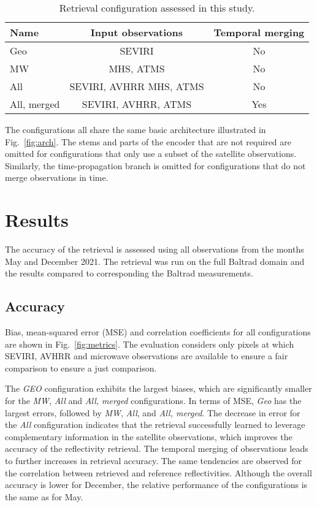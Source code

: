 \documentclass[11pt]{scrartcl}
\begin{document}
\begin{table}[hbpt]
  \begin{center}
  \begin{tabular}{l|cc}
    Name & Input observations & Temporal merging \\
    \hline
    Geo & SEVIRI & No \\
    MW & MHS, ATMS & No \\
    All & SEVIRI, AVHRR MHS, ATMS & No \\
    All, merged & SEVIRI, AVHRR, ATMS & Yes
  \end{tabular}
  \end{center}
  \caption{Retrieval configuration assessed in this study.}
  \label{tab:configurations}
  \end{table}


The configurations all share the same basic architecture illustrated in
Fig.~\ref{fig:arch}. The stems and parts of the encoder that are not required
are omitted for configurations that only use a subset of the satellite
observations. Similarly, the time-propagation branch is omitted for
configurations that do not merge observations in time.


\section{Results}
\label{sec:results}

The accuracy of the retrieval is assessed using all observations from the months
May and December 2021. The retrieval was run on the full Baltrad domain and the
results compared to corresponding the Baltrad measurements.

\subsection{Accuracy}


Bias, mean-squared error (MSE) and correlation coefficients for all
configurations are shown in Fig.~\ref{fig:metrics}. The evaluation considers
only pixels at which SEVIRI, AVHRR and microwave observations are available to
ensure a fair comparison to ensure a just comparison.

The \textit{GEO} configuration exhibits the largest biases, which are
significantly smaller for the \textit{MW}, \textit{All} and \textit{All,
  merged} configurations. In terms of MSE, \textit{Geo} has the largest errors,
followed by \textit{MW}, \textit{All}, and \textit{All, merged}. The decrease in
error for the \textit{All} configuration indicates that the retrieval
successfully learned to leverage complementary information in the satellite
observations, which improves the accuracy of the reflectivity retrieval. The temporal
merging of observations leads to further increases in retrieval accuracy. The
same tendencies are observed  for the correlation between retrieved and
reference reflectivities. Although the overall accuracy is lower for December,
the relative performance of the configurations is the same as for May.
\end{document}
